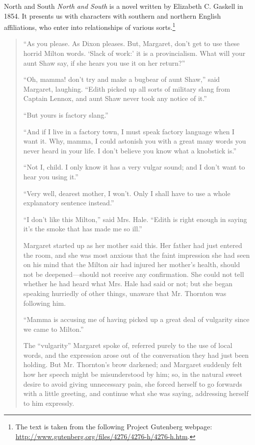 \largerpage[1.5]

\begin{texts}{North and South}
\textit{North and South} is a novel written by Elizabeth C. Gaskell in 1854. It presents us with characters with southern and northern English affiliations, who enter into relationships of various sorts.\footnote{The text is taken from the following Project Gutenberg webpage: \url{http://www.gutenberg.org/files/4276/4276-h/4276-h.htm}.}

\begin{quote}
    \internallinenumbers*{}
    ``As you please. As Dixon pleases. But, Margaret, don't get to use these horrid Milton words. ‘Slack of work:' it is a provincialism. What will your aunt Shaw say, if she hears you use it on her return?''
    
    ``Oh, mamma! don't try and make a bugbear of aunt Shaw,'' said Margaret, laughing. ``Edith picked up all sorts of military slang from Captain Lennox, and aunt Shaw never took any notice of it.''
    
    ``But yours is factory slang.''
    
    ``And if I live in a factory town, I must speak factory language when I want it. Why, mamma, I could astonish you with a great many words you never heard in your life. I don't believe you know what a knobstick is.''
    
    ``Not I, child. I only know it has a very vulgar sound; and I don't want to hear you using it.''
    
    ``Very well, dearest mother, I won't. Only I shall have to use a whole explanatory sentence instead.''
    
    ``I don't like this Milton,'' said Mrs. Hale. ``Edith is right enough in saying it's the smoke that has made me so ill.''
    
    Margaret started up as her mother said this. Her father had just entered the room, and she was most anxious that the faint impression she had seen on his mind that the Milton air had injured her mother's health, should not be deepened—should not receive any confirmation. She could not tell whether he had heard what Mrs. Hale had said or not; but she began speaking hurriedly of other things, unaware that Mr. Thornton was following him.
    
    ``Mamma is accusing me of having picked up a great deal of vulgarity since we came to Milton.''
    
    The ``vulgarity'' Margaret spoke of, referred purely to the use of local words, and the expression arose out of the conversation they had just been holding. But Mr. Thornton's brow darkened; and Margaret suddenly felt how her speech might be misunderstood by him; so, in the natural sweet desire to avoid giving unnecessary pain, she forced herself to go forwards with a little greeting, and continue what she was saying, addressing herself to him expressly.
    

\end{quote}
\end{texts}
